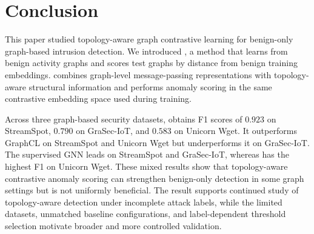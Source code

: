 \section{Conclusion}\label{sec:conclusion}

This paper studied topology-aware graph contrastive learning for benign-only graph-based intrusion detection. We introduced \sysname{}, a method that learns from benign activity graphs and scores test graphs by distance from benign training embeddings. \sysname{} combines graph-level message-passing representations with topology-aware structural information and performs anomaly scoring in the same contrastive embedding space used during training.

Across three graph-based security datasets, \sysname{} obtains F1 scores of $0.923$ on StreamSpot, $0.790$ on GraSec-IoT, and $0.583$ on Unicorn Wget. It outperforms GraphCL on StreamSpot and Unicorn Wget but underperforms it on GraSec-IoT. The supervised GNN leads on StreamSpot and GraSec-IoT, whereas \sysname{} has the highest F1 on Unicorn Wget. These mixed results show that topology-aware contrastive anomaly scoring can strengthen benign-only detection in some graph settings but is not uniformly beneficial. The result supports continued study of topology-aware detection under incomplete attack labels, while the limited datasets, unmatched baseline configurations, and label-dependent threshold selection motivate broader and more controlled validation.
